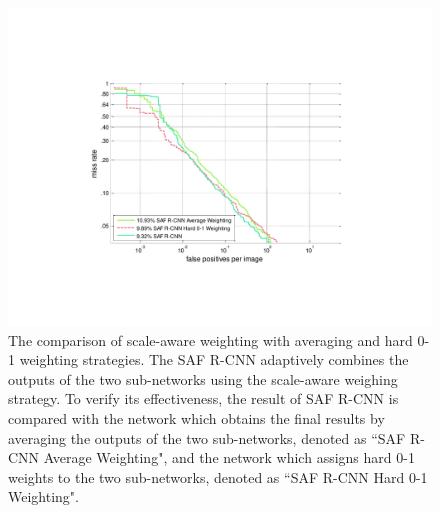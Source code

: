 \documentclass[journal]{IEEEtran}
\begin{document}
\begin{figure}
	\begin{center}
		\includegraphics[scale=0.55]{figures/Caltech_Weighting.pdf}
		\caption{{The comparison of scale-aware weighting with averaging and hard 0-1 weighting strategies. The SAF R-CNN adaptively combines the outputs of the two sub-networks using the scale-aware weighing strategy. To verify its effectiveness, the result of SAF R-CNN is compared with the network which obtains the final results by averaging the outputs of the two sub-networks, denoted as ``SAF R-CNN Average Weighting", and the network which assigns hard 0-1 weights to the two sub-networks, denoted as ``SAF R-CNN Hard 0-1 Weighting".}}	
		\label{fig:Caltech_Weighting}
	\end{center}
	\vspace{-4mm}
\end{figure}


\end{document}
